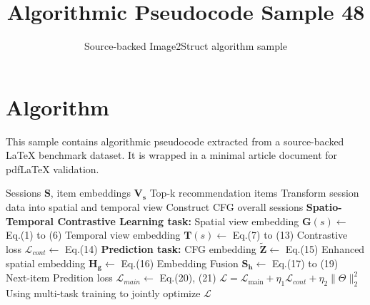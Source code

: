 \documentclass[11pt]{article}
\title{Algorithmic Pseudocode Sample 48}
\author{Source-backed Image2Struct algorithm sample}
\date{}
\begin{document}
\maketitle
\section{Algorithm}
This sample contains algorithmic pseudocode extracted from a source-backed LaTeX benchmark dataset. It is wrapped in a minimal article document for pdfLaTeX validation.

\begin{algorithm}[htbp]
\caption{Source-backed algorithmic procedure}
\begin{algorithm}[htbp]
\small
\caption{Training Process of RESTC}
\begin{algorithmic}[1]
\Require
Sessions $\mathbf{S}$, item embeddings $\mathbf{V_{s}}$
\Ensure
Top-k recommendation items
\State Transform session data into spatial and temporal view
\State Construct CFG overall sessions
\State \textbf{Spatio-Temporal Contrastive Learning task:}
\State Spatial view embedding $\mathbf{G}(s) \gets$ Eq.(1) to (6)
\State Temporal view embedding $\mathbf{T}(s) \gets$ Eq.(7) to (13)
\State Contrastive loss $\mathcal{L}_{cont} \gets$ Eq.(14)
\State \textbf{Prediction task:}
\State CFG embedding $\mathbf{\tilde{Z}} \gets$ Eq.(15)
\State Enhanced spatial embedding $\mathbf{H_{g}} \gets$ Eq.(16)
\State Embedding Fusion $\mathbf{S_{h}} \gets$ Eq.(17) to (19)
\State Next-item Predition loss $\mathcal{L}_{main} \gets$ Eq.(20), (21)
\EndFor
\EndFor
\State $\mathcal{L}=\mathcal{L}_{\text {main}}+\eta_{1} \mathcal{L}_{cont}+\eta_{2}\|\Theta\|_{2}^{2}$
\State Using multi-task training to jointly optimize $\mathcal{L}$
\EndFor
\end{algorithmic}
\end{algorithm}
\end{algorithm}
\end{document}
